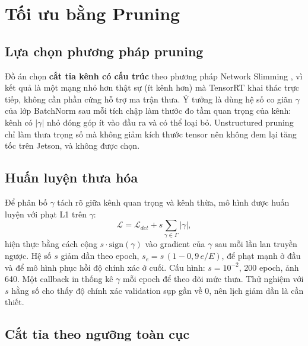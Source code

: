 \section{Tối ưu bằng Pruning}

\subsection{Lựa chọn phương pháp pruning}

Đồ án chọn \textbf{cắt tỉa kênh có cấu trúc} theo phương pháp Network Slimming
\cite{liu2017slimming}, vì kết quả là một mạng nhỏ hơn thật sự (ít kênh hơn) mà
TensorRT khai thác trực tiếp, không cần phần cứng hỗ trợ ma trận thưa. Ý tưởng
là dùng hệ số co giãn $\gamma$ của lớp BatchNorm sau mỗi tích chập làm thước đo
tầm quan trọng của kênh: kênh có $|\gamma|$ nhỏ đóng góp ít vào đầu ra và có thể
loại bỏ. Unstructured pruning chỉ làm thưa trọng số mà không giảm kích thước
tensor nên không đem lại tăng tốc trên Jetson, và không được chọn.

\subsection{Huấn luyện thưa hóa}

Để phân bố $\gamma$ tách rõ giữa kênh quan trọng và kênh thừa, mô hình được
huấn luyện với phạt L1 trên $\gamma$:
\begin{equation}
  \mathcal{L} = \mathcal{L}_{det} + s \sum_{\gamma \in \Gamma} |\gamma|,
\end{equation}
hiện thực bằng cách cộng $s\cdot\mathrm{sign}(\gamma)$ vào gradient của $\gamma$
sau mỗi lần lan truyền ngược. Hệ số $s$ giảm dần theo epoch,
$s_e = s\,(1 - 0{,}9\,e/E)$, để phạt mạnh ở đầu và để mô hình phục hồi độ chính
xác ở cuối. Cấu hình: $s = 10^{-2}$, 200 epoch, ảnh 640. Một callback in thống kê
$\gamma$ mỗi epoch để theo dõi mức thưa. Thử nghiệm với $s$ hằng số cho thấy độ
chính xác validation sụp gần về 0, nên lịch giảm dần là cần thiết.

\subsection{Cắt tỉa theo ngưỡng toàn cục}

